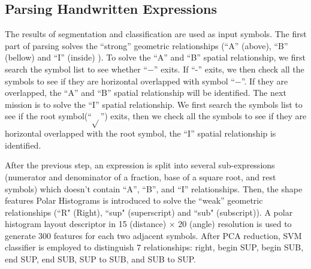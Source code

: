 \documentclass[]{spie}  %
\begin{document}
\subsection{Parsing Handwritten Expressions}


The results of segmentation and classification are used as input symbols. The first part of parsing 
solves the ``strong'' geometric relationships (``A'' (above), ``B'' (bellow) and  ``I'' (inside) ).
 To solve the ``A'' and ``B'' spatial relationship, we first search the symbol 
list to see whether ``$-$'' exits. If ``-'' exits, we then check all the symbols to see if they are 
horizontal overlapped with symbol ``$-$''. If they are overlapped, the ``A'' and ``B''
spatial relationship will be identified. The next mission is to solve the ``I'' spatial relationship. 
We first search the symbols list to see if the root symbol(``$\sqrt{}$'') exits, then we check all the symbols 
to see if they are horizontal overlapped with the root symbol,  the ``I'' spatial 
relationship is identified.

After the previous step, an expression is split into several sub-expressions (numerator and 
denominator of a fraction, base of a square root, and rest symbols) which doesn't contain
  ``A'', ``B'', and ``I'' relationships. 
  Then, the shape features Polar Histograms\cite{Alvaro2013} is introduced to solve the 
``weak'' geometric relationships (``R" (Right), ``sup" (superscript) and ``sub" (subscript)).
A polar histogram layout descriptor in 15 (distance) $\times$ 20 (angle) resolution is used 
to generate 300 features for each two adjacent symbols. After PCA reduction,  SVM classifier is 
employed  to distinguish 7 relationships: right, begin SUP, begin SUB, end SUP, 
end SUB, SUP to SUB, and SUB to SUP.





\end{document}

